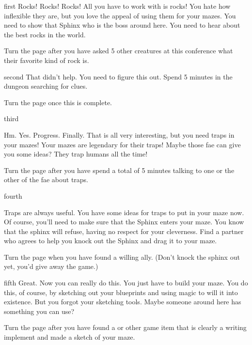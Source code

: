 \documentclass[notebook]{guildcamp2} %
\begin{document}
\startnotebook{\nmazeterpiece{}}

\begin{page}{first}
Rocks! Rocks! Rocks! All you have to work with is rocks! You hate how inflexible they are, but you love the appeal of using them for your mazes.
You need to show that Sphinx who is the boss around here. You need to hear about the best rocks in the world.

Turn the page after you have asked 5 other creatures at this conference what their favorite kind of rock is.
\end{page}

\begin{page}{second}
That didn't help. You need to figure this out. Spend 5 minutes in the dungeon searching for clues.

Turn the page once this is complete.
\end{page}

\begin{page}{third}

Hm. Yes. Progress. Finally. That is all very interesting, but you need traps in your mazes! Your mazes are legendary for their traps! Maybe those fae can give you some ideas? They trap humans all the time!

Turn the page after you have spend a total of 5 minutes talking to one or the other of the fae about traps.
\end{page}

\begin{page}{fourth}

Traps are always useful. You have some ideas for traps to put in your maze now.  Of course, you'll need to make sure that the Sphinx enters your maze. You know that the sphinx will refuse, having no respect for your cleverness. Find a partner who agrees to help you knock out the Sphinx and drag it to your maze.

Turn the page when you have found a willing ally. (Don't knock the sphinx out yet, you'd give away the game.)
\end{page}

\begin{page}{fifth}
Great. Now you can really do this. You just have to build your maze. You do this, of course, by sketching out your blueprints and using magic to will it into existence. But you forgot your sketching tools. Maybe someone around here has something you can use?

Turn the page after you have found a \iQuill{} or other game item that is clearly a writing implement and made a sketch of your maze.
\end{page}
\end{document}
